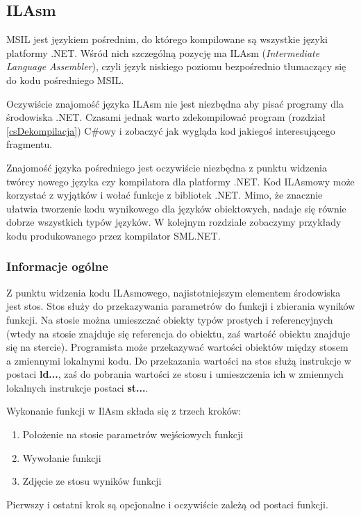 ﻿\subsection{ILAsm}
\label{langIL}

MSIL jest językiem pośrednim, do którego kompilowane są wszystkie języki platformy .NET. Wśród
nich szczególną pozycję ma ILAsm ({\em Intermediate Language Assembler}), czyli język
niskiego poziomu bezpośrednio tłumaczący się do kodu pośredniego MSIL.

Oczywiście znajomość języka ILAsm nie jest niezbędna aby pisać programy dla środowiska .NET. 
Czasami jednak warto zdekompilować program (rozdział \ref{csDekompilacja}) C\#owy i zobaczyć
jak wygląda kod jakiegoś interesującego fragmentu.

Znajomość języka pośredniego jest oczywiście niezbędna z punktu widzenia twórcy nowego języka czy kompilatora
dla platformy .NET. Kod ILAsmowy może korzystać z wyjątków i wołać funkcje z bibliotek .NET. Mimo, że
znacznie ułatwia tworzenie kodu wynikowego dla języków obiektowych, nadaje się równie dobrze wszystkich
typów języków. W kolejnym rozdziale zobaczymy przykłady kodu produkowanego przez kompilator SML.NET.

\subsubsection{Informacje ogólne}

Z punktu widzenia kodu ILAsmowego, najistotniejszym elementem środowiska jest stos. Stos służy do przekazywania
parametrów do funkcji i zbierania wyników funkcji. Na stosie można umieszczać obiekty typów
prostych i referencyjnych (wtedy na stosie znajduje się referencja do obiektu, zaś wartość obiektu znajduje się
na stercie). Programista może przekazywać wartości obiektów między stosem a zmiennymi lokalnymi kodu.
Do przekazania wartości na stos służą instrukcje w postaci {\bf ld...}, zaś do pobrania
wartości ze stosu i umieszczenia ich w zmiennych lokalnych instrukcje postaci {\bf st...}.

Wykonanie funkcji w IlAsm składa się z trzech kroków:
\begin{enumerate}
\item Położenie na stosie parametrów wejściowych funkcji
\item Wywołanie funkcji
\item Zdjęcie ze stosu wyników funkcji
\end{enumerate}

Pierwszy i ostatni krok są opcjonalne i oczywiście zależą od postaci funkcji. 

